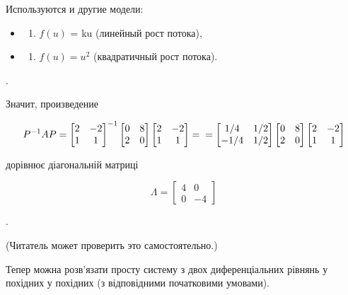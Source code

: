 \documentclass[
  ukrainian,
]{article}
\providecommand{\tightlist}{%
  \setlength{\itemsep}{0pt}\setlength{\parskip}{0pt}}
\begin{document}
Используются и другие модели:

\begin{itemize}
\tightlist
\item
  \begin{enumerate}
  \def\labelenumi{\arabic{enumi})}
  \tightlist
  \item
    \(f(u)\) = ku (линейный рост потока),
  \end{enumerate}
\item
  \begin{enumerate}
  \def\labelenumi{\arabic{enumi})}
  \setcounter{enumi}{1}
  \tightlist
  \item
    \(f(u) = u^2\) (квадратичный рост потока).
  \end{enumerate}
\end{itemize}

.

Значит, произведение

\[
P^{-1}AP =
\begin{bmatrix} 2 & -2 \\ 1 & 1 \end{bmatrix}
^{-1}
\begin{bmatrix} 0 & 8 \\ 2 & 0 \end{bmatrix}
\begin{bmatrix} 2 & -2 \\ 1 & 1 \end{bmatrix}
= \\ =
\begin{bmatrix} 1/4 & 1/2 \\ -1/4 & 1/2 \end{bmatrix}
\begin{bmatrix} 0 & 8 \\ 2 & 0 \end{bmatrix}
\begin{bmatrix} 2 & -2 \\ 1 & 1 \end{bmatrix}
\]

дорівнює діагональній матриці

\[
\Lambda =
\begin{bmatrix} 4 & 0 \\ 0 & -4 \end{bmatrix}
\]

.

(Читатель может проверить это самостоятельно.)

Тепер можна розв'язати просту систему з двох диференціальних рівнянь у
похідних у похідних (з відповідними початковими умовами).
\end{document}
